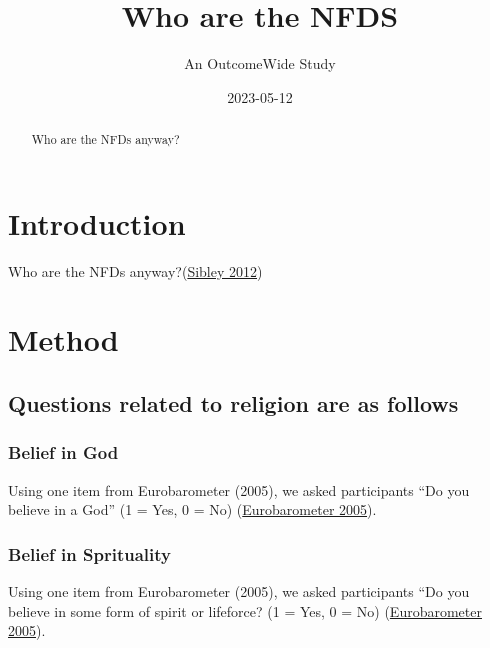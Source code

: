 \documentclass[
  singlecolumn]{report}
\title{Who are the NFDS}
\subtitle{An OutcomeWide Study}
\author{}
\date{2023-05-12}
\begin{document}
\maketitle
\begin{abstract}
Who are the NFDs anyway?
\end{abstract}
\ifdefined\Shaded\renewenvironment{Shaded}{\begin{tcolorbox}[enhanced, interior hidden, sharp corners, frame hidden, borderline west={3pt}{0pt}{shadecolor}, breakable, boxrule=0pt]}{\end{tcolorbox}}\fi

\listoffigures
\listoftables
\hypertarget{introduction}{%
\section{Introduction}\label{introduction}}

Who are the NFDs anyway?(\protect\hyperlink{ref-sibley2012}{Sibley
2012})

\hypertarget{method}{%
\section{Method}\label{method}}

\hypertarget{questions-related-to-religion-are-as-follows}{%
\subsection{Questions related to religion are as
follows}\label{questions-related-to-religion-are-as-follows}}

\hypertarget{belief-in-god}{%
\subsubsection{Belief in God}\label{belief-in-god}}

Using one item from Eurobarometer (2005), we asked participants ``Do you
believe in a God'' (1 = Yes, 0 = No)
(\protect\hyperlink{ref-eurobarometer2005b}{Eurobarometer 2005}).

\hypertarget{belief-in-sprituality}{%
\subsubsection{Belief in Sprituality}\label{belief-in-sprituality}}

Using one item from Eurobarometer (2005), we asked participants ``Do you
believe in some form of spirit or lifeforce? (1 = Yes, 0 = No)
(\protect\hyperlink{ref-eurobarometer2005b}{Eurobarometer 2005}).
\end{document}
